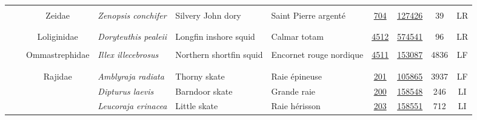 \documentclass[12pt]{article}\usepackage[]{graphicx}\usepackage[]{color}
\begin{document}
\begin{landscapepage}
\begin{longtable}[t]{ccc>{\centering\arraybackslash}p{3cm}>{\centering\arraybackslash}p{3cm}>{\centering\arraybackslash}p{3cm}>{}c>{}ccc}
\addlinespace[0.3em]
\\
\hspace{1em}\hspace{1em} &  & Zeidae & \em{Zenopsis conchifer} & Silvery John dory & Saint Pierre argenté & \href{#sec:604}{704} & \href{http://www.marinespecies.org/aphia.php?p=taxdetails&id=126306}{127426} & 39 & LR\\
\addlinespace[0.3em]
\\
\addlinespace[0.3em]
\\
\hspace{1em}\hspace{1em} &  & Loliginidae & \em{Doryteuthis pealeii} & Longfin inshore squid & Calmar totam & \href{#sec:704}{4512} & \href{http://www.marinespecies.org/aphia.php?p=taxdetails&id=127426}{574541} & 96 & LR\\
\addlinespace[0.3em]
\\
\hspace{1em}\hspace{1em} &  & Ommastrephidae & \em{Illex illecebrosus} & Northern shortfin squid & Encornet rouge nordique & \href{#sec:720}{4511} & \href{http://www.marinespecies.org/aphia.php?p=taxdetails&id=126392}{153087} & 4836 & LF\\
\addlinespace[0.3em]
\\
\addlinespace[0.3em]
\\
\hspace{1em}\hspace{1em} &  & Rajidae & \em{Amblyraja radiata} & Thorny skate & Raie épineuse & \href{#sec:200}{201} & \href{http://www.marinespecies.org/aphia.php?p=taxdetails&id=158548}{105865} & 3937 & LF\\
\hspace{1em}\hspace{1em} &  &  & \em{Dipturus laevis} & Barndoor skate & Grande raie & \href{#sec:201}{200} & \href{http://www.marinespecies.org/aphia.php?p=taxdetails&id=105865}{158548} & 246 & LI\\
\hspace{1em}\hspace{1em} &  &  & \em{Leucoraja erinacea} & Little skate & Raie hérisson & \href{#sec:202}{203} & \href{http://www.marinespecies.org/aphia.php?p=taxdetails&id=158554}{158551} & 712 & LI\\

\end{longtable}
\end{landscapepage}
\end{document}
